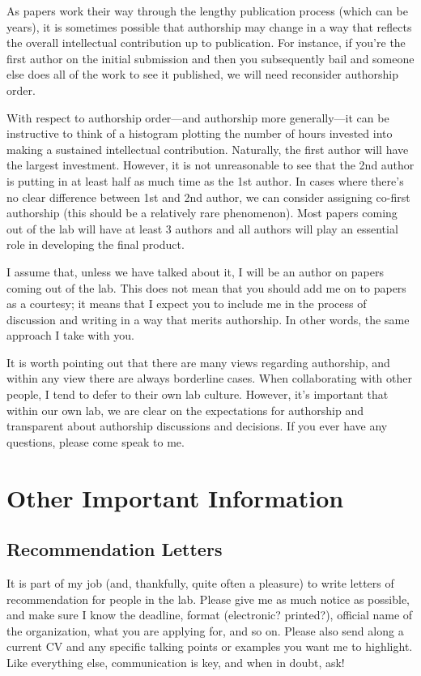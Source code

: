 \documentclass[letterpaper,11pt,oneside]{memoir}
\begin{document}
As papers work their way through the lengthy publication process (which can be years), it is sometimes possible that authorship may change in a way that reflects the overall intellectual contribution up to publication. For instance, if you're the first author on the initial submission and then you subsequently bail and someone else does all of the work to see it published, we will need reconsider authorship order.

With respect to authorship order---and authorship more generally---it can be instructive to think of a histogram plotting the number of hours invested into making a sustained intellectual contribution. Naturally, the first author will have the largest investment. However, it is not unreasonable to see that the 2nd author is putting in at least half as much time as the 1st author. In cases where there's no clear difference between 1st and 2nd author, we can consider assigning co-first authorship (this should be a relatively rare phenomenon). Most papers coming out of the lab will have at least 3 authors and all authors will play an essential role in developing the final product.

I assume that, unless we have talked about it, I will be an author on papers coming out of the lab. This does not mean that you should add me on to papers as a courtesy; it means that I expect you to include me in the process of discussion and writing in a way that merits authorship. In other words, the same approach I take with you.

It is worth pointing out that there are many views regarding authorship, and within any view there are always borderline cases. When collaborating with other people, I tend to defer to their own lab culture. However, it's important that within our own lab, we are clear on the expectations for authorship and transparent about authorship discussions and decisions. If you ever have any questions, please come speak to me.


\chapter{Other Important Information}
\section{Recommendation Letters}
It is part of my job (and, thankfully, quite often a pleasure) to write letters of recommendation for people in the lab. Please give me as much notice as possible, and make sure I know the deadline, format (electronic? printed?), official name of the organization, what you are applying for, and so on. Please also send along a current CV and any specific talking points or examples you want me to highlight. Like everything else, communication is key, and when in doubt, ask!
\end{document}
